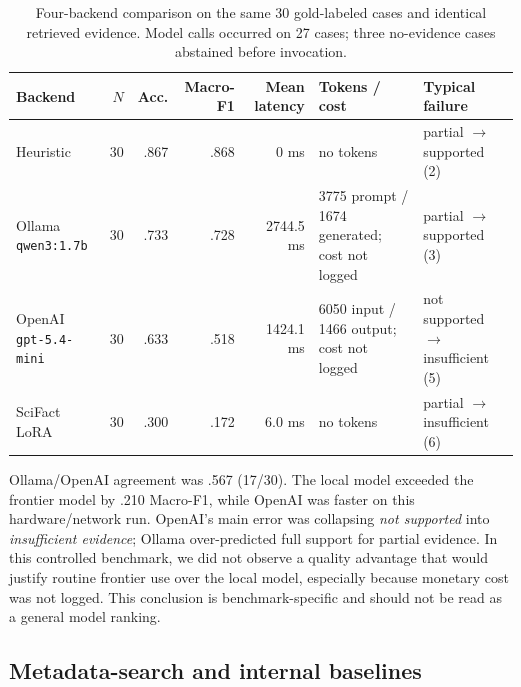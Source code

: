\documentclass[12pt,toc=bib,toc=listof]{scrartcl}
\begin{document}
\begin{table}[H]
\centering
\scriptsize
\setlength{\tabcolsep}{3pt}
\begin{tabularx}{\textwidth}{@{}P{1.8cm}r r r r P{2.5cm}Y@{}}
\toprule
\textbf{Backend} & $N$ & \textbf{Acc.} & \textbf{Macro-F1} & \textbf{Mean latency} & \textbf{Tokens / cost} & \textbf{Typical failure} \\
\midrule
Heuristic & 30 & .867 & .868 & 0 ms & no tokens & partial $\rightarrow$ supported (2) \\
Ollama \texttt{qwen3:1.7b} & 30 & .733 & .728 & 2744.5 ms & 3775 prompt / 1674 generated; cost not logged & partial $\rightarrow$ supported (3) \\
OpenAI \texttt{gpt-5.4-mini} & 30 & .633 & .518 & 1424.1 ms & 6050 input / 1466 output; cost not logged & not supported $\rightarrow$ insufficient (5) \\
SciFact LoRA & 30 & .300 & .172 & 6.0 ms & no tokens & partial $\rightarrow$ insufficient (6) \\
\bottomrule
\end{tabularx}
\caption{Four-backend comparison on the same 30 gold-labeled cases and identical retrieved evidence. Model calls occurred on 27 cases; three no-evidence cases abstained before invocation.}
\label{tab:local_frontier}
\end{table}

Ollama/OpenAI agreement was .567 (17/30). The local model exceeded the frontier model by .210 Macro-F1, while OpenAI was faster on this hardware/network run. OpenAI's main error was collapsing \emph{not supported} into \emph{insufficient evidence}; Ollama over-predicted full support for partial evidence. In this controlled benchmark, we did not observe a quality advantage that would justify routine frontier use over the local model, especially because monetary cost was not logged. This conclusion is benchmark-specific and should not be read as a general model ranking.

\subsection{Metadata-search and internal baselines}
\end{document}
